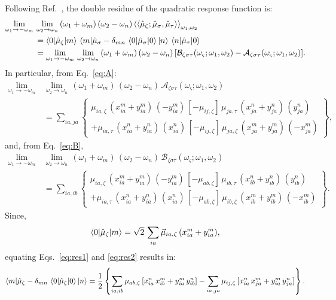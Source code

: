 \documentclass[11pt,a4paper]{article}
\begin{document}
Following Ref.~\cite{dewergifosseNonlinearresponsePropertiesSimplified2019}, the double residue of the quadratic response function is:\begin{align}
		\lim_{\omega_1\to-\omega_m}\,&\lim_{\omega_2\to\omega_n}\,	(\omega_1+\omega_m)\,(\omega_2-\omega_n) \braket{\braket{\hat\mu_\zeta;\hat\mu_\sigma,\hat\mu_\tau}}_{\omega_1,\omega_2}\nonumber\\
		&= \braket{0|\hat\mu_\zeta|m}\,\braket{m|\hat\mu_\sigma - \delta_{mn}\,\braket{0|\hat\mu_\sigma|0}|n}\,\braket{n|\hat\mu_\tau|0} \label{eq:res1} \\
		&= 	\lim_{\omega_1\to-\omega_m}\,\lim_{\omega_2\to\omega_n}\,	(\omega_1+\omega_m)\,(\omega_2-\omega_n)\,[\mathcal B_{\zeta\sigma\tau}(\omega_\varsigma;\omega_1,\omega_2) - \mathcal A_{\zeta\sigma\tau}(\omega_\varsigma;\omega_1,\omega_2)] \label{eq:res2}.
\end{align}
In particular, from Eq.~\eqref{eq:A}:\begin{align*}
	\lim_{\omega_1\to-\omega_m}\,&\lim_{\omega_2\to\omega_n}\,	(\omega_1+\omega_m)\,(\omega_2-\omega_n)\,\mathcal A_{\zeta\sigma\tau}(\omega_\varsigma;\omega_1,\omega_2) \\
	&= \sum_{ia,ja} \left\{
	\begin{array}{l}
		\mu_{ia,\zeta}\,(x^{m}_{ia} + y^{m}_{ia})\,(-y_{ia}^m)\,[-\mu_{ij,\zeta}]\,\mu_{ja,\tau}\,(x^{n}_{ja} + y^{n}_{ja})\,(y_{ja}^n) \\
		+\mu_{ia,\tau}\,(x^{n}_{ia} + y^{n}_{ia})\,(x_{ia}^n)\,[-\mu_{ij,\zeta}]\,\mu_{ja,\zeta}\,(x^{m}_{ja} + y^{m}_{ja})\,(-x_{ja}^m)
	\end{array}
	\right\},
\end{align*}
and, from Eq.~\eqref{eq:B},
\begin{align*}
	\lim_{\omega_1\to-\omega_m}\,&\lim_{\omega_2\to\omega_n}\,	(\omega_1+\omega_m)\,(\omega_2-\omega_n)\,\mathcal B_{\zeta\sigma\tau}(\omega_\varsigma;\omega_1,\omega_2) \\
	&= \sum_{ia,ib} \left\{
	\begin{array}{l}
		\mu_{ia,\zeta}\,(x^{m}_{ia} + y^{m}_{ia})\,(-y_{ia}^m)\,[-\mu_{ab,\zeta}]\,\mu_{ib,\tau}\,(x^{n}_{ib} + y^{n}_{ib})\,(y_{ib}^n) \\
		+\mu_{ia,\tau}\,(x^{n}_{ia} + y^{n}_{ia})\,(x_{ia}^n)\,[-\mu_{ab,\zeta}]\,\mu_{ib,\zeta}\,(x^{m}_{ib} + y^{m}_{ib})\,(-x_{ib}^m)
	\end{array}
	\right\}.
\end{align*}
Since,\begin{equation*}
	\braket{0|\hat\mu_\zeta|m} =  \sqrt{2}\,\sum_{ia} \vec\mu_{ia,\zeta}\,(x^m_{ia}+y^m_{ia}),
\end{equation*}
equating Eqs.~\eqref{eq:res1} and \eqref{eq:res2} results in: \cite{dewergifosseNonlinearresponsePropertiesSimplified2019,dewergifossePerspectiveSimplifiedQuantum2021}\begin{equation}
	\braket{m|\hat\mu_\zeta- \delta_{mn}\,\braket{0|\hat\mu_\zeta|0}|n} = \frac{1}{2}\left\{ \sum_{ia,ib} \mu_{ab,\zeta}\,[x^n_{ia}\,x^m_{ib} + y^m_{ia}\,y^n_{ib}]  - \sum_{ia,ja} \mu_{ij,\zeta}\,[x^n_{ia}\,x^m_{ja} + y^m_{ia}\,y^n_{ja}] \right\}.
\end{equation}
	

	
\end{document}
